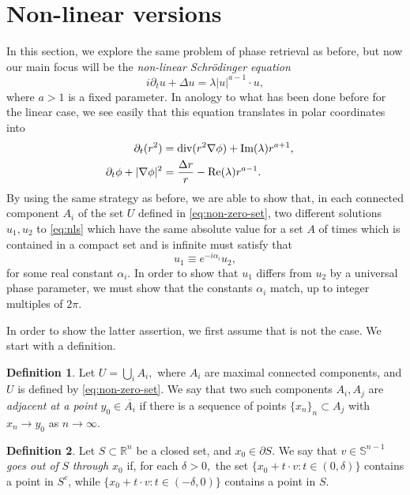 \documentclass[a4paper,11pt,reqno]{amsart}
\numberwithin{equation}{section}
\theoremstyle{plain} %
\theoremstyle{definition} %
\newtheorem{definition}{Definition}[section]
\theoremstyle{remark}
\newcommand{\R}{\mathbb{R}}
\begin{document}
\section{Non-linear versions}

In this section, we explore the same problem of phase retrieval as before, but now our main focus will be the \emph{non-linear Schr\"odinger equation}
\begin{equation}\label{eq:nls}
i \partial_t u + \Delta u = \lambda |u|^{a-1} \cdot u,
\end{equation}
where $a>1$ is a fixed parameter. In anology to what has been done before for the linear case, we see easily that this equation translates in polar coordinates into 
\begin{align}
\partial_t (r^2) &= \text{div}(r^2 \nabla \phi) +  \text{Im}(\lambda) r^{a+1},\cr 
   \partial_t \phi + |\nabla \phi|^2 &= \frac{\Delta r}{r} - \text{Re}(\lambda) r^{a-1}. 
\end{align}
By using the same strategy as before, we are able to show that, in each connected component $A_i$ of the set $U$ defined in \eqref{eq:non-zero-set}, two different solutions $u_1,u_2$ to \eqref{eq:nls} which have the same absolute value for a set $A$ of times which is contained in a compact set and is infinite must satisfy that 
\[
u_1 \equiv e^{-i\alpha_i} u_2,
\]
for some real constant $\alpha_i$. In order to show that $u_1$ differs from $u_2$ by a universal phase parameter, we must show that the constants $\alpha_i$ match, up to integer multiples of $2\pi.$  

In order to show the latter assertion, we first assume that is not the case. We start with a definition. 

\begin{definition} Let $U = \bigcup_i A_i,$ where $A_i$ are maximal connected components, and $U$ is defined by \eqref{eq:non-zero-set}. We say that two such components $A_i,A_j$ are \emph{adjacent at a point} $y_0 \in \overline{A_i}$ if there is a sequence of points $\{x_n\}_n \subset A_j$ with $x_n \to y_0$ as $n \to \infty.$
\end{definition} 

\begin{definition} Let $S \subset \R^n$ be a closed set, and $x_0 \in \partial S$. We say that $v \in \mathbb{S}^{n-1}$ \emph{ goes out of } $S$ \emph{through $x_0$} if, for each $\delta >0,$ the set $\{x_0 + t \cdot v \colon t  \in (0,\delta)\}$ contains a point in $S^c$, while $\{ x_0 + t \cdot v \colon t \in (-\delta,0)\}$ contains a point in $S.$
\end{definition}
\end{document}
